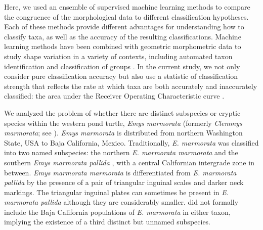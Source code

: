 \documentclass[12pt,letterpaper]{article}
\begin{document}
Here, we used an ensemble of supervised machine learning methods to compare the congruence of the morphological data to different classification hypotheses. Each of these methods provide different advantages for understanding how to classify taxa, as well as the accuracy of the resulting classifications. 
Machine learning methods have been combined with geometric morphometric data to study shape variation in a variety of contexts, including automated taxon identification and classification of groups \citep{Baylac2003,Dobigny2003,MacLeod2007,VanBocxlaer2010,VandenBrink2011,Navega2015}. %
In the current study, we not only consider pure classification accuracy but also use a statistic of classification strength that reflects the rate at which taxa are both accurately and inaccurately classified: the area under the Receiver Operating Characteristic curve \citep{Hastie2009}. 

We analyzed the problem of whether there are distinct subspecies or cryptic species within the western pond turtle, \textit{Emys marmorata} \citep{Baird1852} (formerly \emph{Clemmys marmorata}; see \citealp{Feldman2002}). \textit{Emys marmorata} is distributed from northern Washington State, USA to Baja California, Mexico. Traditionally, \textit{E. marmorata} was classified into two named subspecies: the northern \textit{E. marmorata marmorata} and the southern \textit{Emys marmorata pallida} \citep{Seeliger1945}, with a central Californian intergrade zone in between. \textit{Emys marmorata marmorata} is differentiated from \textit{E. marmorata pallida} by the presence of a pair of triangular inguinal scales and darker neck markings. The triangular inguinal plates can sometimes be present in \textit{E. marmorata pallida} although they are considerably smaller. \citet{Seeliger1945} did not formally include the Baja California populations of \textit{E. marmorata} in either taxon, implying the existence of a third distinct but unnamed subspecies.
\end{document}
